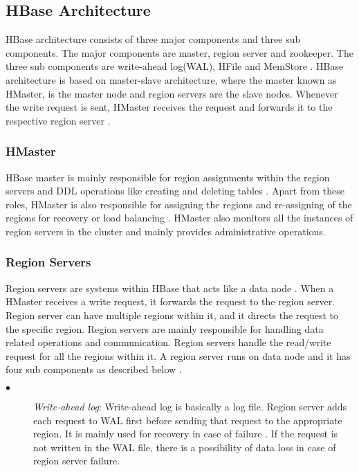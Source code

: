 \documentclass[11pt,a4paper,bibtotoc,idxtotoc,headsepline,footsepline,footexclude,BCOR12mm,DIV13]{scrbook}
\begin{document}

\newpage
\subsection{HBase Architecture}
\label{HBase Architecture}

HBase architecture consists of three major components and three sub components. The major components are master, region server and zookeeper. The three sub components are write-ahead log(WAL), HFile and MemStore \cite{hbase:insights}. HBase architecture is based on master-slave architecture, where the master known as HMaster, is the master node and region servers are the slave nodes. Whenever the write request is sent, HMaster receives the request and forwards it to the respective region server \cite{hbase:insights}. 

\subsubsection{HMaster}
\label{hmaster}

HBase master is mainly responsible for region assignments within the region servers and DDL operations like creating and deleting tables \cite{hbase:architecture}. Apart from these roles, HMaster is also responsible for assigning the regions and re-assigning of the regions for recovery or load balancing \cite{hbase:architecture}. HMaster also monitors all the instances of region servers in the cluster \cite{hbase:architecture} and mainly provides administrative operations.

\subsubsection{Region Servers}
\label{region serves}

Region servers are systems within HBase that acts like a data node \cite{hbase:insights}. When a HMaster receives a write request, it forwards the request to the region server. Region server can have multiple regions within it, and it directs the request to the specific region. Region servers are mainly responsible for handling data related operations and communication. Region servers handle the read/write request for all the regions within it. 
A region server runs on data node and it has four sub components as described below \cite{hbase:architecture}.
\begin{description}
	\item[$\bullet$]  \emph{Write-ahead log}: Write-ahead log is basically a log file. Region server adds each request to WAL first before sending that request to the appropriate region. It is mainly used for recovery in case of failure \cite{hbase:insights}. If the request is not written in the WAL file, there is a possibility of data loss in case of region server failure.
\end{description}
\end{document}
